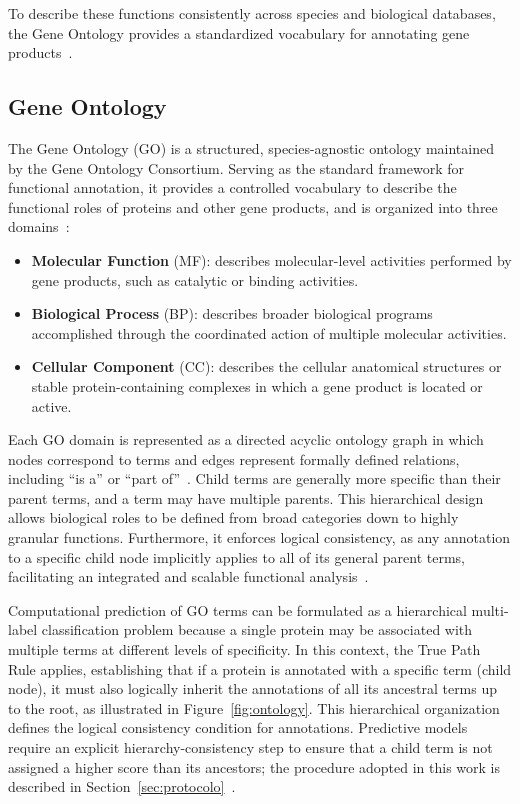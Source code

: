 \documentclass[Ingles]{ic-tese-v3}
\begin{document}
To describe these functions consistently across species and biological databases, the Gene Ontology provides a standardized vocabulary for annotating gene products~\cite{ashburner_gene_2000, geneontology2026}.

\subsection{Gene Ontology}

The Gene Ontology (GO) is a structured, species-agnostic ontology maintained by the Gene Ontology Consortium. Serving as the standard framework for functional annotation, it provides a controlled vocabulary to describe the functional roles of proteins and other gene products, and is organized into three domains~\cite{geneontology2026}: 

\begin{itemize}
    \item \textbf{Molecular Function} (MF): describes molecular-level activities performed by gene products, such as catalytic or binding activities.
    \item \textbf{Biological Process} (BP): describes broader biological programs accomplished through the coordinated action of multiple molecular activities.
    \item \textbf{Cellular Component} (CC): describes the cellular anatomical structures or stable protein-containing complexes in which a gene product is located or active.
\end{itemize} 

Each GO domain is represented as a directed acyclic ontology graph in which nodes correspond to terms and edges represent formally defined relations, including ``is a'' or ``part of''~\cite{ashburner_gene_2000}. Child terms are generally more specific than their parent terms, and a term may have multiple parents. This hierarchical design allows biological roles to be defined from broad categories down to highly granular functions. Furthermore, it enforces logical consistency, as any annotation to a specific child node implicitly applies to all of its general parent terms, facilitating an integrated and scalable functional analysis~\cite{safari-alighiarloo_protein-protein_2014, dessimoz_cafa_2013, oliveira2023temprot}. 

Computational prediction of GO terms can be formulated as a hierarchical multi-label classification problem because a single protein may be associated with multiple terms at different levels of specificity. In this context, the True Path Rule applies, establishing that if a protein is annotated with a specific term (child node), it must also logically inherit the annotations of all its ancestral terms up to the root, as illustrated in Figure~\ref{fig:ontology}. This hierarchical organization defines the logical consistency condition for annotations. Predictive models require an explicit hierarchy-consistency step to ensure that a child term is not assigned a higher score than its ancestors; the procedure adopted in this work is described in Section~\ref{sec:protocolo}~\cite{valentini2010true}.
\end{document}
